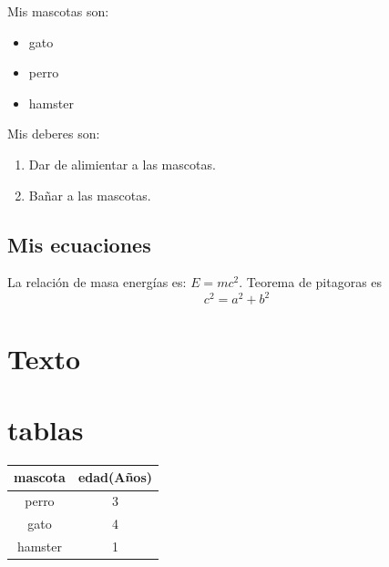 \documentclass[11pt, letterpaper]{article}
\begin{document}
Mis mascotas son:\\
\begin{itemize}[noitemsep,nolistsep]  %
    \item gato
    \item perro
    \item hamster
\end{itemize}

Mis deberes son:
\begin{enumerate}  %
    \item Dar de alimientar a las mascotas.
    \item Bañar a las mascotas.
\end{enumerate} 


\subsection{Mis ecuaciones}

La relación de masa energías es: $E=mc^2$.
Teorema de pitagoras es
\begin{equation} 
    c^2=a^2+b^2
\end{equation}

\section{Texto}
\lipsum[1] %

\section{tablas}

\begin{tabular}{||c|c||}
    \hline 
    mascota & edad(Años)\\ \hline \hline
    perro & 3 \\ \hline
    gato & 4\\ \hline
    hamster & 1 \\ \hline
\end{tabular}
\end{document}
